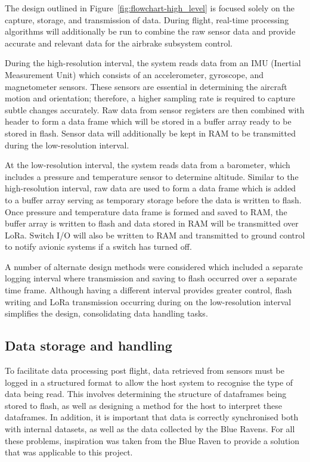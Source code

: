 The design outlined in Figure~\ref{fig:flowchart-high_level} is focused solely on the capture, storage, and transmission of data. During flight, real-time processing algorithms will additionally be run to combine the raw sensor data and provide accurate and relevant data for the airbrake subsystem control.

During the high-resolution interval, the system reads data from an IMU (Inertial Measurement Unit) which consists of an accelerometer, gyroscope, and magnetometer sensors. These sensors are essential in determining the aircraft motion and orientation; therefore, a higher sampling rate is required to capture subtle changes accurately. Raw data from sensor registers are then combined with header to form a data frame which will be stored in a buffer array ready to be stored in flash. Sensor data will additionally be kept in RAM to be transmitted during the low-resolution interval.  

At the low-resolution interval, the system reads data from a barometer, which includes a pressure and temperature sensor to determine altitude. Similar to the high-resolution interval, raw data are used to form a data frame which is added to a buffer array serving as temporary storage before the data is written to flash. Once pressure and temperature data frame is formed and saved to RAM, the buffer array is written to flash and data stored in RAM will be transmitted over LoRa. Switch I/O will also be written to RAM and transmitted to ground control to notify avionic systems if a switch has turned off.  

A number of alternate design methods were considered which included a separate logging interval where transmission and saving to flash occurred over a separate time frame. Although having a different interval provides greater control, flash writing and LoRa transmission occurring during on the low-resolution interval simplifies the design, consolidating data handling tasks.  

\subsection{Data storage and handling}
To facilitate data processing post flight, data retrieved from sensors must be logged in a structured format to allow the host system to recognise the type of data being read. This involves determining the structure of dataframes being stored to flash, as well as designing a method for the host to interpret these dataframes. In addition, it is important that data is correctly synchronised both with internal datasets, as well as the data collected by the Blue Ravens. For all these problems, inspiration was taken from the Blue Raven to provide a solution that was applicable to this project.

